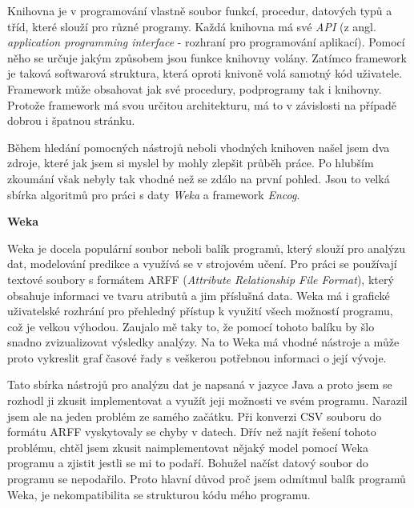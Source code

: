 \documentclass[a4paper,12pt,twoside]{scrreprt}
\begin{document}
Knihovna je v programování vlastně soubor funkcí, procedur, datových typů a tříd, které slouží pro různé programy. Každá knihovna má své \textit{API} (z angl. \textit{application programming interface} - rozhraní pro programování aplikací). Pomocí něho se určuje jakým způsobem jsou funkce knihovny volány. Zatímco framework je taková softwarová struktura, která oproti knivoně volá samotný kód uživatele. Framework může obsahovat jak své procedury, podprogramy tak i knihovny. Protože framework má svou určitou architekturu, má to v závislosti na případě dobrou i špatnou stránku.      

Během hledání pomocných nástrojů neboli vhodných knihoven našel jsem dva zdroje, které jak jsem si myslel by mohly zlepšit průběh práce. Po hlubším zkoumání však nebyly tak vhodné než se zdálo na první pohled. Jsou to velká sbírka algoritmů pro práci s daty \textit{Weka} a framework \textit{Encog}.  
\vspace*{0.5cm}

\textbf{Weka}

Weka je docela populární soubor neboli balík programů, který slouží pro analýzu dat, modelování predikce a využívá se v strojovém učení. Pro práci se používají textové soubory s formátem ARFF (\textit{Attribute Relationship File Format}), který obsahuje informaci ve tvaru atributů a jim příslušná data. Weka má i grafické uživatelské rozhrání pro přehledný přístup k využití všech možností programu, což je velkou výhodou. Zaujalo mě taky to, že pomocí tohoto balíku by šlo snadno zvizualizovat výsledky analýzy. Na to Weka má vhodné nástroje a může proto vykreslit graf časové řady s veškerou potřebnou informaci o její vývoje. 

Tato sbírka nástrojů pro analýzu dat je napsaná v jazyce Java a proto jsem se rozhodl ji zkusit implementovat a využít jeji možnosti ve svém programu. Narazil jsem ale na jeden problém ze samého začátku. Při konverzi CSV souboru do formátu ARFF vyskytovaly se chyby v datech. Dřív než najít řešení tohoto problému, chtěl jsem zkusit naimplementovat nějaký model pomocí Weka programu a zjistit jestli se mi to podaří. Bohužel načíst datový soubor do programu se nepodařilo. Proto hlavní důvod proč jsem odmítmul balík programů Weka, je nekompatibilita se strukturou kódu mého programu.            
\end{document}
